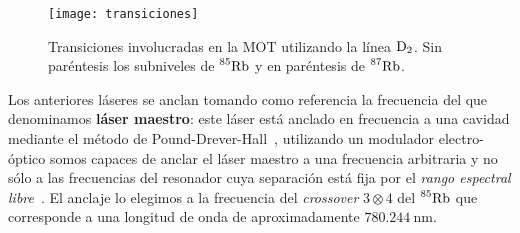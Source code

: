 \begin{wrapfigure}{l}{0.45\textwidth}
\vspace{-2\baselineskip}
\centering
\begin{minipage}{0.42\textwidth}
\centering
\texttt{[image: transiciones]}  
\caption[Transiciones del Rb]{\label{fig:transiciones}Transiciones involucradas en la MOT utilizando la línea $\mathrm{D}_{2}$. Sin paréntesis los subniveles de $\prescript{85}{}{\mathrm{Rb}}$ y en paréntesis de $\prescript{87}{}{\mathrm{Rb}}$.}
\end{minipage}
\end{wrapfigure}

Los anteriores láseres se anclan tomando como referencia la frecuencia del que denominamos \textbf{láser maestro}: este láser está anclado en frecuencia a una cavidad mediante el método de Pound-Drever-Hall~\cite{black}, utilizando un modulador electro-óptico somos capaces de anclar el láser maestro a una frecuencia arbitraria y no sólo a las frecuencias del resonador cuya separación está fija por el \emph{rango espectral libre}~\cite{steck1}. El anclaje lo elegimos a la frecuencia del \emph{crossover} $3\otimes4$ del $\prescript{85}{}{\mathrm{Rb}}$ que corresponde a una longitud de onda de aproximadamente $\SI{780.244}{\nano\meter}$.

%
%


